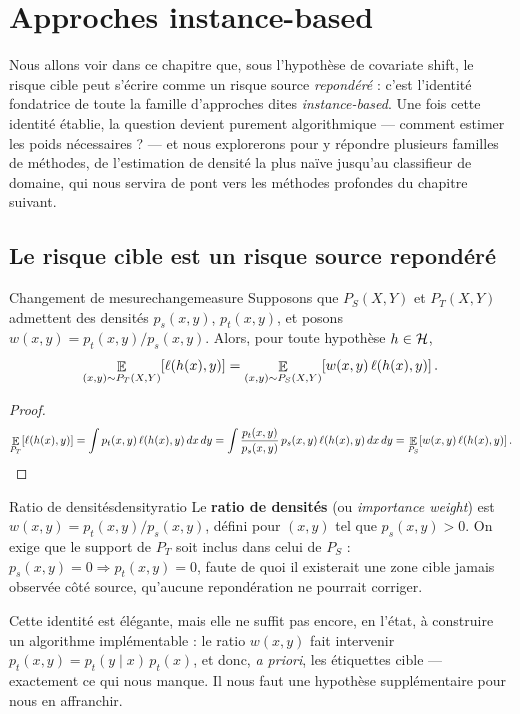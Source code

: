 \documentclass[11pt]{article}
\begin{document}
\section{Approches instance-based}
\label{sec:instance}

Nous allons voir dans ce chapitre que, sous l'hypothèse de covariate shift, le risque cible peut
s'écrire comme un risque source \emph{repondéré} : c'est l'identité fondatrice de toute la famille
d'approches dites \emph{instance-based}. Une fois cette identité établie, la question devient purement
algorithmique --- comment estimer les poids nécessaires ? --- et nous explorerons pour y répondre
plusieurs familles de méthodes, de l'estimation de densité la plus naïve jusqu'au classifieur de domaine,
qui nous servira de pont vers les méthodes profondes du chapitre suivant.

\subsection{Le risque cible est un risque source repondéré}

\begin{proposition}{Changement de mesure}{changemeasure}
Supposons que $P_S(X,Y)$ et $P_T(X,Y)$ admettent des densités $p_s(x,y)$, $p_t(x,y)$, et posons
$w(x,y) = p_t(x,y)/p_s(x,y)$. Alors, pour toute hypothèse $h\in\mathcal{H}$,
\[
\mathop{\mathbb{E}}_{(x,y)\sim P_T(X,Y)}\!\left[\ell(h(x),y)\right] = \mathop{\mathbb{E}}_{(x,y)\sim P_S(X,Y)}\!\left[w(x,y)\,\ell(h(x),y)\right].
\]
\end{proposition}
\begin{proof}
\[
\mathop{\mathbb{E}}_{P_T}\!\left[\ell(h(x),y)\right] = \int p_t(x,y)\,\ell(h(x),y)\,dx\,dy
 = \int \frac{p_t(x,y)}{p_s(x,y)}\, p_s(x,y)\,\ell(h(x),y)\,dx\,dy
 = \mathop{\mathbb{E}}_{P_S}\!\left[w(x,y)\,\ell(h(x),y)\right].\qedhere
\]
\end{proof}

\begin{definition}{Ratio de densités}{densityratio}
Le \textbf{ratio de densités} (ou \emph{importance weight}) est $w(x,y) = p_t(x,y)/p_s(x,y)$, défini pour
$(x,y)$ tel que $p_s(x,y)>0$. On exige que le support de $P_T$ soit inclus dans celui de $P_S$ :
$p_s(x,y)=0 \Rightarrow p_t(x,y)=0$, faute de quoi il existerait une zone cible jamais observée côté
source, qu'aucune repondération ne pourrait corriger.
\end{definition}

Cette identité est élégante, mais elle ne suffit pas encore, en l'état, à construire un algorithme
implémentable : le ratio $w(x,y)$ fait intervenir $p_t(x,y)=p_t(y\mid x)\,p_t(x)$, et donc, \emph{a
priori}, les étiquettes cible --- exactement ce qui nous manque. Il nous faut une hypothèse
supplémentaire pour nous en affranchir.
\end{document}
